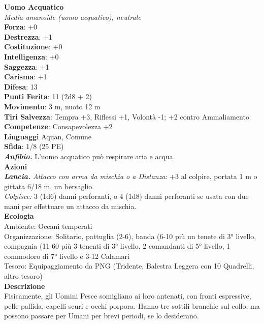 \begin{multicols}{2}
\medskip\textbf{Uomo Acquatico}\\
\emph{Media umanoide (uomo acquatico), neutrale}\\
\textbf{Forza}: +0\\
\textbf{Destrezza}: +1\\
\textbf{Costituzione}: +0\\
\textbf{Intelligenza}: +0\\
\textbf{Saggezza}: +1\\
\textbf{Carisma}: +1\\
\textbf{Difesa}: 13\\
\textbf{Punti Ferita}: 11 (2d8 + 2)\\
\textbf{Movimento}: 3 m, nuoto 12 m\\
\textbf{Tiri Salvezza}:  Tempra +3, Riflessi +1, Volontà -1; +2 contro Ammaliamento\\
\textbf{Competenze}: Consapevolezza +2\\
\textbf{Linguaggi} Aquan, Comune\\
\textbf{Sfida}: 1/8 (25 PE)\smallskip\\
\emph{\textbf{Anfibio.}} L'uomo acquatico può respirare aria e acqua.\\
\smallskip\textbf{Azioni}\\
\emph{\textbf{Lancia.} Attacco con arma da mischia o a Distanza}: +3 al colpire, portata 1 m o gittata 6/18 m, un bersaglio.\\
\emph{Colpisce:} 3 (1d6) danni perforanti, o 4 (1d8) danni perforanti se usata con due mani per effettuare un attacco da mischia.\\
\textbf{Ecologia}\\
Ambiente: Oceani temperati\\
Organizzazione: Solitario, pattuglia (2-6), banda (6-10 più un tenete di 3° livello, compagnia (11-60 più 3 tenenti di 3° livello, 2 comandanti di 5° livello, 1 commodoro di 7° livello e 3-12 Calamari\\
Tesoro: Equipaggiamento da PNG (Tridente, Balestra Leggera con 10 Quadrelli, altro tesoro)\\
\textbf{Descrizione}\\
Fisicamente, gli Uomini Pesce somigliano ai loro antenati, con fronti espressive, pelle pallida, capelli scuri e occhi porpora. Hanno tre sottili branchie sul collo, ma possono passare per Umani per brevi periodi, se lo desiderano.\\


\end{multicols}
